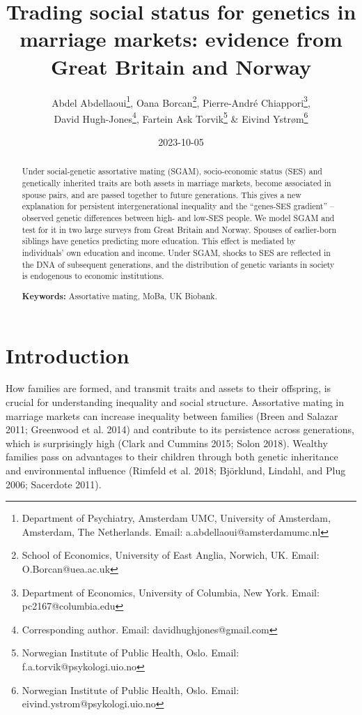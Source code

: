 \documentclass[
  12pt,
]{article}
\title{Trading social status for genetics in marriage markets:
evidence from Great Britain and Norway}
\author{Abdel Abdellaoui\thanks{Department of Psychiatry, Amsterdam UMC, University 
of Amsterdam, Amsterdam, The Netherlands. Email: a.abdellaoui@amsterdamumc.nl},
Oana Borcan\thanks{School of Economics, University of East Anglia, Norwich, 
UK. Email: O.Borcan@uea.ac.uk},
Pierre-André Chiappori\thanks{Department of Economics, University of Columbia, 
  New York. Email: pc2167@columbia.edu},\\
David Hugh-Jones\thanks{Corresponding author. Email: davidhughjones@gmail.com},
Fartein Ask Torvik\thanks{Norwegian Institute of Public Health, Oslo. 
  Email: f.a.torvik@psykologi.uio.no} \&
Eivind Ystrøm\thanks{Norwegian Institute of Public Health, Oslo. 
  Email: eivind.ystrom@psykologi.uio.no}}
\date{2023-10-05}
\theoremstyle{definition}
\theoremstyle{definition}
\theoremstyle{definition}
\theoremstyle{definition}
\theoremstyle{remark}
\begin{document}
\maketitle
\begin{abstract}
Under social-genetic assortative mating (SGAM), socio-economic status (SES) and
genetically inherited traits are both assets in marriage markets, become
associated in spouse pairs, and are passed together to future generations.
This gives a new explanation for persistent intergenerational inequality and
the ``genes-SES gradient'' -- observed genetic differences between high- and
low-SES people. We model SGAM and test for it in two large surveys from Great
Britain and Norway. Spouses of earlier-born siblings have genetics predicting
more education. This effect is mediated by individuals' own education and
income. Under SGAM, shocks to SES are reflected in the DNA of subsequent
generations, and the distribution of genetic variants in society is endogenous
to economic institutions.

\par

\textbf{Keywords:} Assortative mating, MoBa, UK Biobank.
\end{abstract}

\normalem

\hypertarget{introduction}{%
\section{Introduction}\label{introduction}}

How families are formed, and transmit traits and assets to their offspring, is
crucial for understanding inequality and social structure. Assortative mating in
marriage markets can increase inequality between families
(Breen and Salazar 2011; Greenwood et al. 2014) and contribute to its persistence
across generations, which is surprisingly high
(Clark and Cummins 2015; Solon 2018). Wealthy families pass on advantages
to their children through both genetic inheritance and environmental influence
(Rimfeld et al. 2018; Björklund, Lindahl, and Plug 2006; Sacerdote 2011).
\end{document}

